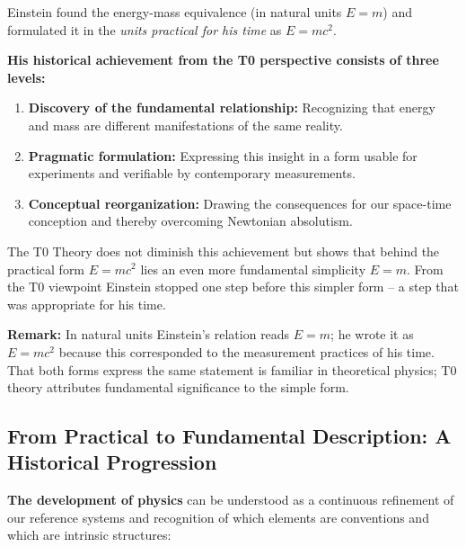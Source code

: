 	\begin{tcolorbox}[colback=green!10!white,colframe=green!75!black,title=Einstein's Achievement from the T0 Viewpoint]
		Einstein found the energy-mass equivalence (in natural units \( E = m \)) and formulated it in the \textit{units practical for his time} as \( E = mc^2 \).
		
		\textbf{His historical achievement from the T0 perspective consists of three levels:}
		
		\begin{enumerate}
			\item \textbf{Discovery of the fundamental relationship:} Recognizing that energy and mass are different manifestations of the same reality.
			
			\item \textbf{Pragmatic formulation:} Expressing this insight in a form usable for experiments and verifiable by contemporary measurements.
			
			\item \textbf{Conceptual reorganization:} Drawing the consequences for our space-time conception and thereby overcoming Newtonian absolutism.
		\end{enumerate}
		
		The T0 Theory does not diminish this achievement but shows that behind the practical form \( E = mc^2 \) lies an even more fundamental simplicity \( E = m \). From the T0 viewpoint Einstein stopped one step before this simpler form – a step that was appropriate for his time.
		
		\textbf{Remark:} In natural units Einstein's relation reads \( E = m \); he wrote it as \( E = mc^2 \) because this corresponded to the measurement practices of his time. That both forms express the same statement is familiar in theoretical physics; T0 theory attributes fundamental significance to the simple form.
	\end{tcolorbox}
	
	\subsection{From Practical to Fundamental Description: A Historical Progression}
	
	\textbf{The development of physics} can be understood as a continuous refinement of our reference systems and recognition of which elements are conventions and which are intrinsic structures:
	
